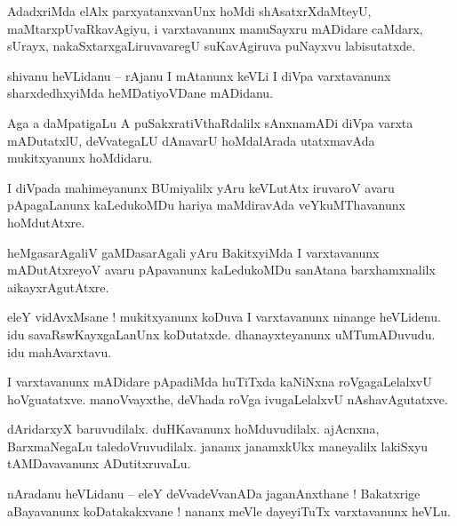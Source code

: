 \documentclass{article}
\begin{document}
\begin{mn}%
AdadxriMda elAlx parxyatanxvanUnx hoMdi shAsatxrXdaMteyU, maMtarxpUvaRkavAgiyu, i varxtavanunx 
manuSayxru mADidare caMdarx, sUrayx, nakaSxtarxgaLiruvavaregU suKavAgiruva puNayxvu labisutatxde.
\end{mn}

\begin{mn}%
shivanu heVLidanu -- rAjanu I mAtanunx keVLi I diVpa varxtavanunx sharxdedhxyiMda heMDatiyoVDane 
mADidanu.
\end{mn}

\begin{mn}%
Aga a daMpatigaLu A puSakxratiVthaRdalilx sAnxnamADi diVpa varxta mADutatxlU, deVvategaLU dAnavarU 
hoMdalArada utatxmavAda mukitxyanunx hoMdidaru.
\end{mn}

\begin{mn}%
I diVpada mahimeyanunx BUmiyalilx yAru keVLutAtx iruvaroV avaru pApagaLanunx kaLedukoMDu hariya 
maMdiravAda veYkuMThavanunx hoMdutAtxre.
\end{mn}

\begin{mn}%
heMgasarAgaliV gaMDasarAgali yAru BakitxyiMda I varxtavanunx mADutAtxreyoV avaru pApavanunx 
kaLedukoMDu sanAtana barxhamxnalilx aikayxrAgutAtxre.
\end{mn}

\begin{mn}%
eleY vidAvxMsane ! mukitxyanunx koDuva I varxtavanunx ninange heVLidenu. idu savaRswKayxgaLanUnx 
koDutatxde. dhanayxteyanunx uMTumADuvudu. idu mahAvarxtavu.
\end{mn}

\begin{mn}%
I varxtavanunx mADidare pApadiMda huTiTxda kaNiNxna roVgagaLelalxvU hoVguatatxve. manoVvayxthe, 
deVhada roVga ivugaLelalxvU nAshavAgutatxve.
\end{mn}

\begin{mn}%
dAridarxyX baruvudilalx. duHKavanunx hoMduvudilalx. ajAcnxna, BarxmaNegaLu taledoVruvudilalx. 
janamx janamxkUkx maneyalilx lakiSxyu tAMDavavanunx ADutitxruvaLu.
\end{mn}


\begin{mn}%
nAradanu heVLidanu -- eleY deVvadeVvanADa jaganAnxthane ! Bakatxrige aBayavanunx koDatakakxvane ! 
nananx meVle dayeyiTuTx varxtavanunx heVLu.
\end{mn}
\end{document}
